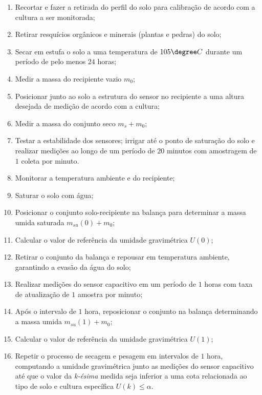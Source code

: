 \begin{itemize}
			\begin{enumerate}
				\item Recortar e fazer a retirada do perfil do solo para calibração de acordo com a cultura a ser monitorada;
				\item Retirar resquícios orgânicos e minerais (plantas e pedras) do solo;
				\item Secar em estufa o solo a uma temperatura de $105 \degree C$ durante um período de pelo menos $24$ horas;
				\item Medir a massa do recipiente vazio $m_0$;
				\item Posicionar junto ao solo a estrutura do sensor no recipiente a uma altura desejada de medição de acordo com a cultura;
				\item Medir a massa do conjunto seco $m_s+m_0$;
				\item Testar a estabilidade dos sensores; irrigar até o ponto de saturação do solo e realizar medições ao longo de um período de $20$ minutos com amostragem de $1$ coleta por minuto. 
				\item Monitorar a temperatura ambiente e do recipiente;
				\item Saturar o solo com água;
				\item Posicionar o conjunto solo-recipiente na balança para determinar a massa umida saturada $m_{su}(0)+m_0$;
				\item Calcular o valor de referência da umidade gravimétrica $U(0)$;
				\item Retirar o conjunto da balança e repousar em temperatura ambiente, garantindo a evasão da água do solo;
				\item Realizar medições do sensor capacitivo em um período de $1$ horas com taxa de atualização de $1$ amostra por minuto;
				\item Após o intervalo de $1$ hora, reposicionar o conjunto na balança determinando a massa umida $m_{su}(1)+m_0$;
				\item Calcular o valor de referência da umidade gravimétrica $U(1)$;
				\item Repetir o processo de secagem e pesagem em intervalos de $1$ hora, computando a umidade gravimétrica junto as medições do sensor capacitivo até que o valor da \textit{k-ésima} medida seja inferior a uma cota relacionada ao tipo de solo e cultura específica $U(k) \leq \alpha$. 
			\end{enumerate}	

		\end{itemize}
		
